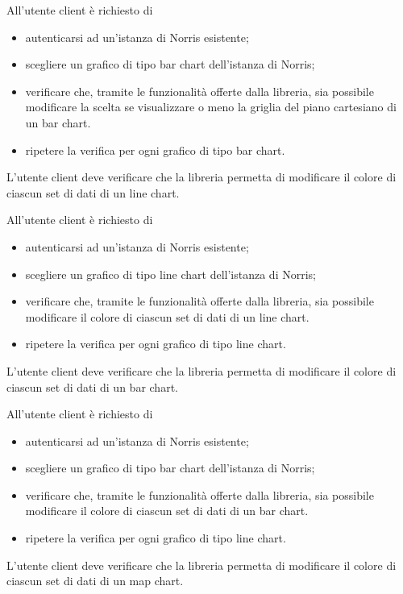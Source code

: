 		All'utente client è richiesto di
		\begin{itemize}
			\item autenticarsi ad un'istanza di Norris esistente;
			\item scegliere un grafico di tipo bar chart dell'istanza di Norris;
			\item verificare che, tramite le funzionalità offerte dalla libreria, sia possibile modificare la scelta se visualizzare o meno la griglia del piano cartesiano di un bar chart.
			\item ripetere la verifica per ogni grafico di tipo bar chart.
		\end{itemize}

	L'utente client deve verificare che la libreria permetta di modificare il colore di ciascun set di dati di un line chart.
		
		All'utente client è richiesto di
		\begin{itemize}
			\item autenticarsi ad un'istanza di Norris esistente;
			\item scegliere un grafico di tipo line chart dell'istanza di Norris;
			\item verificare che, tramite le funzionalità offerte dalla libreria, sia possibile modificare il colore di ciascun set di dati di un line chart.
			\item ripetere la verifica per ogni grafico di tipo line chart.
		\end{itemize}

	L'utente client deve verificare che la libreria permetta di modificare il colore di ciascun set di dati di un bar chart.
		
		All'utente client è richiesto di
		\begin{itemize}
			\item autenticarsi ad un'istanza di Norris esistente;
			\item scegliere un grafico di tipo bar chart dell'istanza di Norris;
			\item verificare che, tramite le funzionalità offerte dalla libreria, sia possibile modificare il colore di ciascun set di dati di un bar chart.
			\item ripetere la verifica per ogni grafico di tipo line chart.
		\end{itemize}

	L'utente client deve verificare che la libreria permetta di modificare il colore di ciascun set di dati di un map chart.
		
